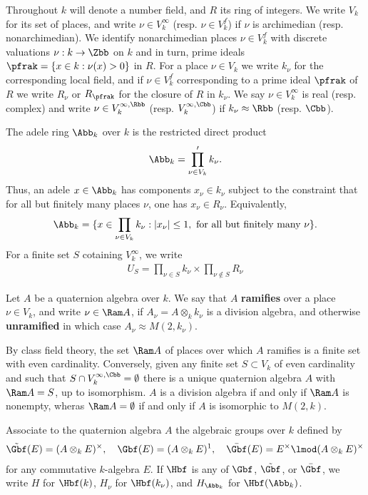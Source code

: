 Throughout $k$ will denote a number field, and $R$ its ring of integers. We write $V_k$ for its set of places, and write $\nu \in V_k^\infty$ (resp. $\nu \in V_k^f$) if $\nu$ is archimedian (resp. nonarchimedian).
We identify nonarchimedian places $\nu \in V_k^f$ with discrete valuations $\nu : k \to \Zbb$ on $k$ and in turn, prime ideals $\pfrak = \{ x \in k: \nu(x) > 0\}$ in $R$.
For a place $\nu \in V_k$ we write $k_\nu$ for the corresponding local field, and if $\nu \in V_k^f$ corresponding to a prime ideal $\pfrak$ of $R$ we write $R_\nu$ or $R_\pfrak$ for the closure of $R$ in $k_\nu$.
We say $\nu \in V_k^\infty$ is real (resp. complex) and write $\nu \in V_k^{\infty,\Rbb}$ (resp. $V_k^{\infty,\Cbb}$) if $k_\nu \approx \Rbb$ (resp. $\Cbb$).

The adele ring $\Abb_k$ over $k$ is the restricted direct product
\begin{align}
    \Abb_k = \prod_{\nu \in V_k}' k_\nu.
\end{align}
Thus, an adele $x \in \Abb_k$ has components $x_\nu \in k_\nu$ subject to the constraint that for all but finitely many places $\nu$, one has  $x_\nu \in R_\nu$. Equivalently,
\begin{align}
    \Abb_k = \{x \in \prod_{\nu\in V_k} k_\nu : |x_\nu| \leq 1, \text{ for all but finitely many $\nu$}\}.
\end{align}
For a finite set $S$ cotaining $V_k^\infty$, we write
\begin{align}
    U_S = \prod_{\nu \in S}k_\nu \times \prod_{\nu \notin S}R_\nu
\end{align}


Let $A$ be a quaternion algebra over $k$. We say that $A$ \textbf{ramifies} over a place $\nu \in V_k$, and write $\nu \in \Ram A$, if $A_\nu = A \otimes_k k_\nu$ is a division algebra, and otherwise \textbf{unramified} in which case $A_\nu \approx M(2,k_\nu)$.

By class field theory, the set $\Ram A$ of places over which $A$ ramifies is a finite set with even cardinality. Conversely, given any finite set $S \subset V_k$ of even cardinality and such that $S\cap V_k^{\infty,\Cbb}=\emptyset$ there is a unique quaternion algebra $A$ with $\Ram A = S$, up to isomorphism. $A$ is a division algebra if and only if $\Ram A$ is nonempty, wheras $\Ram A = \emptyset$ if and only if $A$ is isomorphic to $M(2,k)$.

Associate to the quaternion algebra $A$ the algebraic groups over $k$ defined by
\begin{align*}
    \tilde{\Gbf}(E) = (A\otimes_k E)^\times,\quad \Gbf (E) = (A\otimes_k E)^1,\quad  \bar{\Gbf}(E) = E^\times \lmod (A\otimes_k E)^\times
\end{align*}
for any commutative $k$-algebra $E$. If $\Hbf$ is any of $\Gbf$, $\tilde{\Gbf}$, or $\bar{\Gbf}$, we write $H$ for $\Hbf(k)$, $H_\nu$ for $\Hbf(k_\nu)$, and $H_{\Abb_k}$ for $\Hbf(\Abb_k)$.

